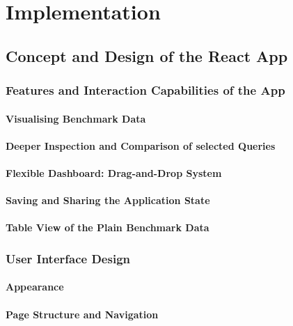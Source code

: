 
\chapter{Implementation}\label{chapter:implementation}

\section{Concept and Design of the React App}
\subsection{Features and Interaction Capabilities of the App}
\subsubsection{Visualising Benchmark Data}
\subsubsection{Deeper Inspection and Comparison of selected Queries}
\subsubsection{Flexible Dashboard: Drag-and-Drop System}
\subsubsection{Saving and Sharing the Application State}
\subsubsection{Table View of the Plain Benchmark Data}
\subsection{User Interface Design}
\subsubsection{Appearance}
\subsubsection{Page Structure and Navigation}
\subsubsection{}

